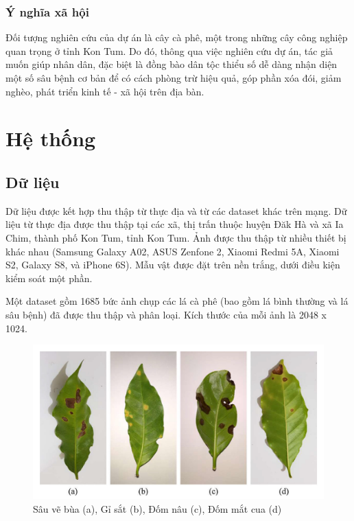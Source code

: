 \documentclass[a4paper,14pt]{extarticle}
\begin{document}
		\subsubsection{Ý nghĩa xã hội}
		Đối tượng nghiên cứu của dự án là cây cà phê, một trong những cây công nghiệp quan trọng ở tỉnh Kon Tum. Do đó, thông qua việc nghiên cứu dự án, tác giả muốn giúp nhân dân, đặc biệt là đồng bào dân tộc thiểu số dễ dàng nhận diện một số sâu bệnh cơ bản để có cách phòng trừ hiệu quả, góp phần xóa đói, giảm nghèo, phát triển kinh tế - xã hội trên địa bàn.

\section{Hệ thống}
	\subsection{Dữ liệu}
	Dữ liệu được kết hợp thu thập từ thực địa và từ các dataset khác trên mạng. Dữ liệu từ thực địa được thu thập tại các xã, thị trấn thuộc huyện Đăk Hà và xã Ia Chim, thành phố Kon Tum, tỉnh Kon Tum. Ảnh được thu thập từ nhiều thiết bị khác nhau (Samsung Galaxy A02, ASUS Zenfone 2, Xiaomi Redmi 5A, Xiaomi S2, Galaxy S8, và iPhone 6S). Mẫu vật được đặt trên nền trắng, dưới điều kiện kiểm soát một phần.

	Một dataset gồm 1685 bức ảnh chụp các lá cà phê (bao gồm lá bình thường và lá sâu bệnh) đã được thu thập và phân loại. Kích thước của mỗi ảnh là 2048 x 1024.

	\begin{figure}[H]
		\centering
		\includegraphics[scale=0.35]{images/image1}
		\caption{Sâu vẽ bùa (a), Gỉ sắt (b), Đốm nâu (c), Đốm mắt cua (d)}
	\end{figure}
\end{document}
